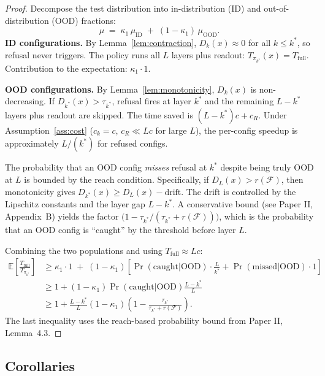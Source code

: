 \documentclass[11pt,a4paper]{article}
\begin{document}
\begin{proof}
    Decompose the test distribution into in-distribution (ID) and out-of-distribution (OOD) fractions:
    \begin{equation}
        \mu \;=\; \kappa_1\,\mu_{\text{ID}} \;+\; (1-\kappa_1)\,\mu_{\text{OOD}}.
    \end{equation}
    \textbf{ID configurations.} By Lemma~\ref{lem:contraction}, $D_k(x)\approx 0$ for all $k\le k^*$, so refusal never triggers. The policy runs all $L$ layers plus readout: $T_{\pi_{k^*}}(x)=T_{\text{full}}$. Contribution to the expectation: $\kappa_1\cdot 1$.

    \textbf{OOD configurations.} By Lemma~\ref{lem:monotonicity}, $D_k(x)$ is non-decreasing. If $D_{k^*}(x)>\tau_{k^*}$, refusal fires at layer $k^*$ and the remaining $L-k^*$ layers plus readout are skipped. The time saved is $(L-k^*)c + c_R$. Under Assumption~\ref{ass:cost} ($c_k=c$, $c_R\ll Lc$ for large $L$), the per-config speedup is approximately $L/(k^*)$ for refused configs.

    The probability that an OOD config \emph{misses} refusal at $k^*$ despite being truly OOD at $L$ is bounded by the reach condition. Specifically, if $D_L(x)>r(\mathcal{F})$, then monotonicity gives $D_{k^*}(x)\ge D_L(x) - \text{drift}$. The drift is controlled by the Lipschitz constants and the layer gap $L-k^*$. A conservative bound (see Paper II, Appendix~B) yields the factor $\bigl(1 - \tau_{k^*}/(\tau_{k^*}+r(\mathcal{F}))\bigr)$, which is the probability that an OOD config is ``caught'' by the threshold before layer $L$.

    Combining the two populations and using $T_{\text{full}}\approx Lc$:
    \begin{align}
        \mathbb{E}\!\left[\frac{T_{\text{full}}}{T_{\pi_{k^*}}}\right]
        &\ge \kappa_1 \cdot 1 \;+\; (1-\kappa_1)\left[\Pr(\text{caught}|\text{OOD})\cdot\frac{L}{k^*} + \Pr(\text{missed}|\text{OOD})\cdot 1\right] \\
        &\ge 1 + (1-\kappa_1)\Pr(\text{caught}|\text{OOD})\frac{L-k^*}{L} \\
        &\ge 1 + \frac{L-k^*}{L}(1-\kappa_1)\left(1-\frac{\tau_{k^*}}{\tau_{k^*}+r(\mathcal{F})}\right).
    \end{align}
    The last inequality uses the reach-based probability bound from Paper II, Lemma~4.3.
\end{proof}

\subsection{Corollaries}\label{sec:corollaries}
\end{document}
